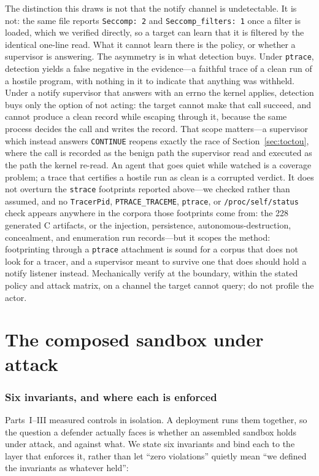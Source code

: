 \documentclass[11pt]{article}
\begin{document}
The distinction this draws is not that the notify channel is undetectable. It is not: the same file
reports \texttt{Seccomp:~2} and \texttt{Seccomp\_filters:~1} once a filter is loaded, which we verified
directly, so a target can learn that it is filtered by the identical one-line read. What it cannot learn
there is the policy, or whether a supervisor is answering. The asymmetry is in what detection buys.
Under \texttt{ptrace}, detection yields a false negative in the evidence---a faithful trace of a clean run
of a hostile program, with nothing in it to indicate that anything was withheld. Under a notify
supervisor that answers with an errno the kernel applies, detection buys only the option of not acting:
the target cannot make that call succeed, and cannot produce a clean record while escaping through it,
because the same process decides the call and writes the record. That scope matters---a supervisor which
instead answers \texttt{CONTINUE} reopens exactly the race of Section~\ref{sec:toctou}, where the call is
recorded as the benign path the supervisor read and executed as the path the kernel re-read. An agent
that goes quiet while watched is a coverage problem; a trace that certifies a hostile run as clean is a
corrupted verdict. It does not overturn the
\texttt{strace} footprints reported above---we checked rather than assumed, and no \texttt{TracerPid},
\texttt{PTRACE\_TRACEME}, \texttt{ptrace}, or \texttt{/proc/self/status} check appears anywhere in the
corpora those footprints come from: the 228 generated C artifacts, or the injection, persistence,
autonomous-destruction, concealment, and enumeration run records---but it scopes the method: footprinting through a
\texttt{ptrace} attachment is sound for a corpus that does not look for a tracer, and a supervisor meant
to survive one that does should hold a notify listener instead. Mechanically verify at the boundary,
within the stated policy and attack matrix, on a channel the target cannot query; do not profile the
actor.

\part{The composed sandbox under attack}

\section{Six invariants, and where each is enforced}\label{sec:composed}

Parts~I--III measured controls in isolation. A deployment runs them together, so the question a defender
actually faces is whether an assembled sandbox holds under attack, and against what. We state six
invariants and bind each to the layer that enforces it, rather than let ``zero violations'' quietly mean
``we defined the invariants as whatever held'':
\end{document}
